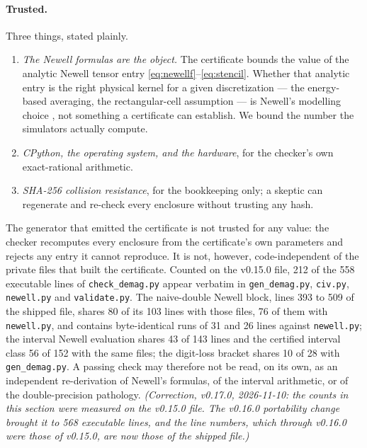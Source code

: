 \documentclass[11pt]{amsart}
\theoremstyle{plain}
\theoremstyle{definition}
\theoremstyle{remark}
\begin{document}
\paragraph{Trusted.} Three things, stated plainly.
\begin{enumerate}
  \item \emph{The Newell formulas are the object.} The certificate bounds the
  value of the analytic Newell tensor entry \eqref{eq:newellf}--\eqref{eq:stencil}.
  Whether that analytic entry is the right physical kernel for a given
  discretization --- the energy-based averaging, the rectangular-cell assumption
  --- is Newell's modelling choice \cite{Newell1993}, not something a certificate
  can establish. We bound the number the simulators actually compute.
  \item \emph{CPython, the operating system, and the hardware}, for the checker's
  own exact-rational arithmetic.
  \item \emph{SHA-256 collision resistance}, for the bookkeeping only; a skeptic
  can regenerate and re-check every enclosure without trusting any hash.
\end{enumerate}
The generator that emitted the certificate is not trusted for any value: the
checker recomputes every enclosure from the certificate's own parameters and
rejects any entry it cannot reproduce. It is not, however, code-independent
of the private files that built the certificate. Counted on the v0.15.0 file,
212 of the 558 executable lines of \texttt{check\_demag.py} appear verbatim in
\texttt{gen\_demag.py}, \texttt{civ.py}, \texttt{newell.py} and
\texttt{validate.py}. The naive-double Newell block, lines 393 to 509 of the
shipped file, shares 80 of its 103 lines with
those files, 76 of them with \texttt{newell.py}, and contains byte-identical
runs of 31 and 26 lines against \texttt{newell.py}; the interval Newell
evaluation shares 43 of 143 lines and the certified interval class 56 of 152
with the same files; the digit-loss bracket shares 10 of 28 with
\texttt{gen\_demag.py}. A passing check may therefore not be read, on its
own, as an independent re-derivation of Newell's formulas, of the interval
arithmetic, or of the double-precision pathology. \emph{(Correction, v0.17.0,
2026-11-10: the counts in this section were measured on the v0.15.0 file. The
v0.16.0 portability change brought it to 568 executable lines, and the line
numbers, which through v0.16.0 were those of v0.15.0, are now those of the
shipped file.)}
\end{document}
